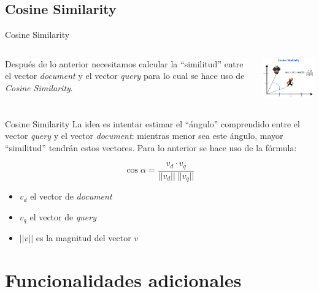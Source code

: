 \documentclass{beamer}
\begin{document}
\subsection*{Cosine Similarity}

\begin{frame}{Cosine Similarity}
  \begin{columns}[T]
    \begin{column}[T]{6cm}
      Después de lo anterior necesitamos calcular la ``similitud'' entre el
      vector {\it document} y el vector {\it query} para lo cual se hace uso de {\it
          Cosine Similarity}.
    \end{column}
    \begin{column}[T]{5cm}
      \includegraphics[width=5cm]{images/cosine.png}
    \end{column}
  \end{columns}
\end{frame}

\begin{frame}{Cosine Similarity}
  La idea es intentar estimar el ``ángulo'' comprendido entre
  el vector {\it query} y el vector {\it document}: mientras menor sea este
  ángulo, mayor ``similitud'' tendrán estos vectores. Para lo anterior se hace
  uso de la f\'ormula:

  \begin{equation}
    \cos \alpha = \frac{v_d \cdot v_q}{||v_d|| ~ ||v_q||} \nonumber
  \end{equation}

  \begin{itemize}
    \item $v_d$ el vector de {\it document}
    \item $v_q$ el vector de {\it query}
    \item $||v||$ es la magnitud del vector $v$
  \end{itemize}
\end{frame}

\section{Funcionalidades adicionales}
\end{document}

